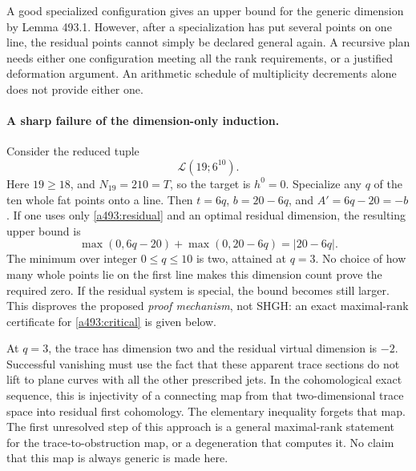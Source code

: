 \documentclass[11pt]{article}
\begin{document}
A good specialized configuration gives an upper bound for the generic
dimension by Lemma 493.1. However, after a specialization has put several
points on one line, the residual points cannot simply be declared general
again. A recursive plan needs either one configuration meeting all the
rank requirements, or a justified deformation argument. An arithmetic
schedule of multiplicity decrements alone does not provide either one.

\paragraph{A sharp failure of the dimension-only induction.}
Consider the reduced tuple
\begin{equation}\label{a493:critical}
                             \mathcal L(19;6^{10}).
\end{equation}
Here $19\geq18$, and $N_{19}=210=T$, so the target is $h^0=0$.
Specialize any $q$ of the ten whole fat points onto a line. Then
$t=6q$, $b=20-6q$, and $A'=6q-20=-b$. If one uses only
\eqref{a493:residual} and an optimal residual dimension, the resulting
upper bound is
\[
                   \max(0,6q-20)+\max(0,20-6q)=|20-6q|.
\]
The minimum over integer $0\leq q\leq10$ is two, attained at $q=3$.
No choice of how many whole points lie on the first line makes this
dimension count prove the required zero. If the residual system is special,
the bound becomes still larger. This disproves the proposed \emph{proof
mechanism}, not SHGH: an exact maximal-rank certificate for
\eqref{a493:critical} is given below.

At $q=3$, the trace has dimension two and the residual virtual dimension
is $-2$. Successful vanishing must use the fact that these apparent trace
sections do not lift to plane curves with all the other prescribed jets.
In the cohomological exact sequence, this is injectivity of a connecting
map from that two-dimensional trace space into residual first cohomology.
The elementary inequality forgets that map. The first unresolved step of
this approach is a general maximal-rank statement for the trace-to-obstruction
map, or a degeneration that computes it. No claim that this map is always
generic is made here.
\end{document}
